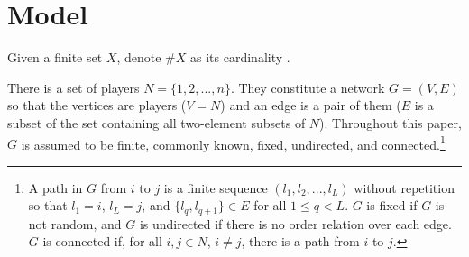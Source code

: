 \documentclass[12pt,letter]{article}
\theoremstyle{definition}
\theoremstyle{remark}
\theoremstyle{claim}
\begin{document}
%
%
%
%

\section{Model}
\label{sec:model}
Given a finite set $X$, denote $\#X$ as its cardinality . 


There is a set of players $N=\{1,2,...,n\}$. They constitute a network $G=(V,E)$ so that the vertices are players ($V=N$) and an edge is a pair of them ($E$ is a subset of the set containing all two-element subsets of $N$). Throughout this paper, $G$ is assumed to be finite, commonly known, fixed, undirected, and connected.\footnote{A path in $G$ from $i$ to $j$ is a finite sequence $(l_1,l_2,...,l_L)$ without repetition so that $l_1=i$, $l_L=j$, and $\{l_q,l_{q+1}\}\in E$ for all $1\leq q<L$. $G$ is fixed if $G$ is not random, and $G$ is undirected if there is no order relation over each edge. $G$ is connected if, for all $i,j\in N$, $i\neq j$, there is a path from $i$ to $j$.}
\end{document}
